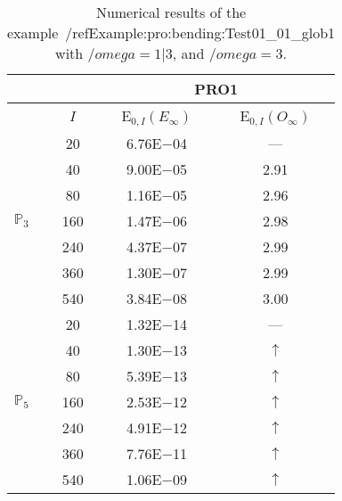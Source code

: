 \begin{table}[H]
\caption{Numerical results of the example~/ref{Example:pro:bending:Test01_01_glob1} with $/omega=1|3$, and $/omega=3$.}
\setlength{\tabcolsep}{5pt}
\centering
\begin{tabular}{@{}l c c c@{}}
\toprule
 &  & \multicolumn{2}{c}{PRO1}\\
\midrule
 & $I$ & E$_{0,I}(E_{\infty})$ & E$_{0,I}(O_{\infty})$\\
\midrule
\multirow{7}{*}{$\mathbb{P}_{3}$}
 & 20 & 6.76E$-$04 & ---\\
 & 40 & 9.00E$-$05 & 2.91\\
 & 80 & 1.16E$-$05 & 2.96\\
 & 160 & 1.47E$-$06 & 2.98\\
 & 240 & 4.37E$-$07 & 2.99\\
 & 360 & 1.30E$-$07 & 2.99\\
 & 540 & 3.84E$-$08 & 3.00\\
\midrule
\multirow{7}{*}{$\mathbb{P}_{5}$}
 & 20 & 1.32E$-$14 & ---\\
 & 40 & 1.30E$-$13 & $\uparrow$\\
 & 80 & 5.39E$-$13 & $\uparrow$\\
 & 160 & 2.53E$-$12 & $\uparrow$\\
 & 240 & 4.91E$-$12 & $\uparrow$\\
 & 360 & 7.76E$-$11 & $\uparrow$\\
 & 540 & 1.06E$-$09 & $\uparrow$\\
\bottomrule
\end{tabular}
\label{Table:pRO:test_01_01_test11_pro3}
\end{table}
